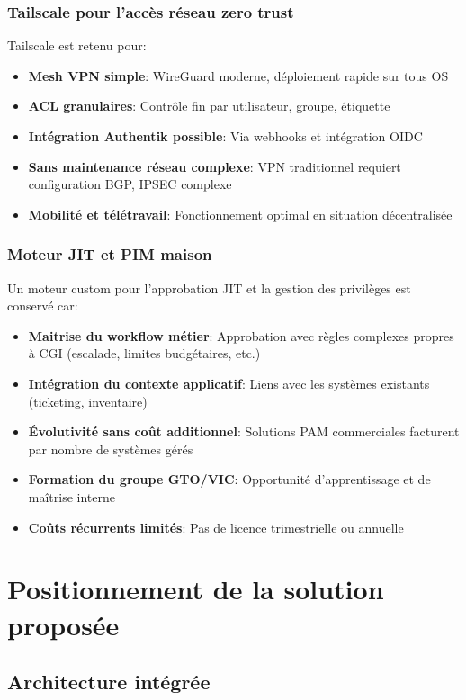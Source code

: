 \subsubsection{Tailscale pour l'accès réseau zero trust}

Tailscale est retenu pour:
\begin{itemize}
    \item \textbf{Mesh VPN simple}: WireGuard moderne, déploiement rapide sur tous OS
    \item \textbf{ACL granulaires}: Contrôle fin par utilisateur, groupe, étiquette
    \item \textbf{Intégration Authentik possible}: Via webhooks et intégration OIDC
    \item \textbf{Sans maintenance réseau complexe}: VPN traditionnel requiert configuration BGP, IPSEC complexe
    \item \textbf{Mobilité et télétravail}: Fonctionnement optimal en situation décentralisée
\end{itemize}

\subsubsection{Moteur JIT et PIM maison}

Un moteur custom pour l'approbation JIT et la gestion des privilèges est conservé car:
\begin{itemize}
    \item \textbf{Maitrise du workflow métier}: Approbation avec règles complexes propres à CGI (escalade, limites budgétaires, etc.)
    \item \textbf{Intégration du contexte applicatif}: Liens avec les systèmes existants (ticketing, inventaire)
    \item \textbf{Évolutivité sans coût additionnel}: Solutions PAM commerciales facturent par nombre de systèmes gérés
    \item \textbf{Formation du groupe GTO/VIC}: Opportunité d'apprentissage et de maîtrise interne
    \item \textbf{Coûts récurrents limités}: Pas de licence trimestrielle ou annuelle
\end{itemize}

\section{Positionnement de la solution proposée}

\subsection{Architecture intégrée}

